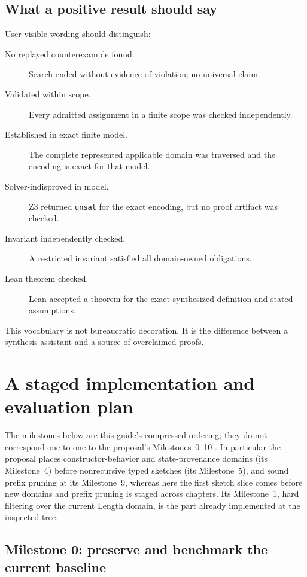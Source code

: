 \documentclass[10pt,letterpaper,oneside]{report}
\newcommand{\unsat}{\texttt{unsat}}
\begin{document}
\section{What a positive result should say}

User-visible wording should distinguish:

\begin{description}
\item[No replayed counterexample found.] Search ended without evidence of violation; no universal claim.
\item[Validated within scope.] Every admitted assignment in a finite scope was checked independently.
\item[Established in exact finite model.] The complete represented applicable domain was traversed and the encoding is exact for that model.
\item[Solver-indisproved in model.] Z3 returned \unsat{} for the exact encoding, but no proof artifact was checked.
\item[Invariant independently checked.] A restricted invariant satisfied all domain-owned obligations.
\item[Lean theorem checked.] Lean accepted a theorem for the exact synthesized definition and stated assumptions.
\end{description}

This vocabulary is not bureaucratic decoration. It is the difference between a synthesis assistant and a source of overclaimed proofs.

\chapter{A staged implementation and evaluation plan}
\label{chap:staged-plan}
\begin{projectnote}
The milestones below are this guide's compressed ordering; they do not correspond one-to-one to the proposal's Milestones~0--10 \cite{proposal}. In particular the proposal places constructor-behavior and state-provenance domains (its Milestone~4) before nonrecursive typed sketches (its Milestone~5), and sound prefix pruning at its Milestone~9, whereas here the first sketch slice comes before new domains and prefix pruning is staged across chapters. Its Milestone~1, hard filtering over the current Length domain, is the part already implemented at the inspected tree.
\end{projectnote}


\section{Milestone 0: preserve and benchmark the current baseline}
\end{document}
